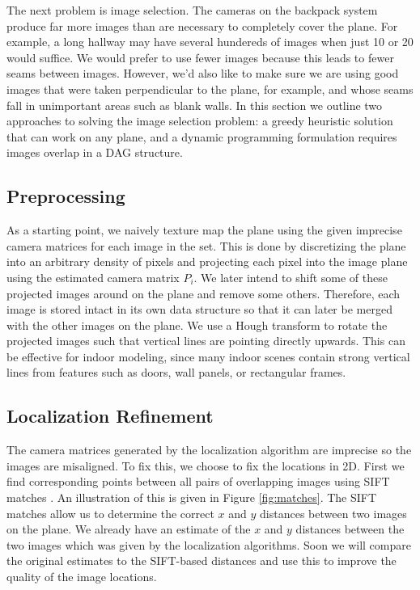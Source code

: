 \documentclass[runningheads]{llncs}
\begin{document}
The next problem is image selection. The cameras on the backpack system produce far more images than are necessary to completely cover the plane. For example, a long hallway may have several hundereds of images when just 10 or 20 would suffice. We would prefer to use fewer images because this leads to fewer seams between images. However, we'd also like to make sure we are using good images that were taken perpendicular to the plane, for example, and whose seams fall in unimportant areas such as blank walls. In this section we outline two approaches to solving the image selection problem: a greedy heuristic solution that can work on any plane, and a dynamic programming formulation requires images overlap in a DAG structure. 

\subsection{Preprocessing}
As a starting point, we naively texture map the plane using the given imprecise camera matrices for each image in the set. This is done by discretizing the plane into an arbitrary density of pixels and projecting each pixel into the image plane using the estimated camera matrix $P_i$. We later intend to shift some of these projected images around on the plane and remove some others. Therefore, each image is stored intact in its own data structure so that it can later be merged with the other images on the plane. We use a Hough transform to rotate the projected images such that vertical lines are pointing directly upwards. This can be effective for indoor modeling, since many indoor scenes contain strong vertical lines from features such as doors, wall panels, or rectangular frames. 


\subsection{Localization Refinement}

The camera matrices generated by the localization algorithm are imprecise so the images are misaligned. To fix this, we choose to fix the locations in 2D. First we find corresponding points between all pairs of overlapping images using SIFT matches \cite{lowe1999object}. An illustration of this is given in Figure \ref{fig:matches}. The SIFT matches allow us to determine the correct $x$ and $y$ distances between two images on the plane. We already have an estimate of the $x$ and $y$ distances between the two images which was given by the localization algorithms. Soon we will compare the original estimates to the SIFT-based distances and use this to improve the quality of the image locations. 
\end{document}
